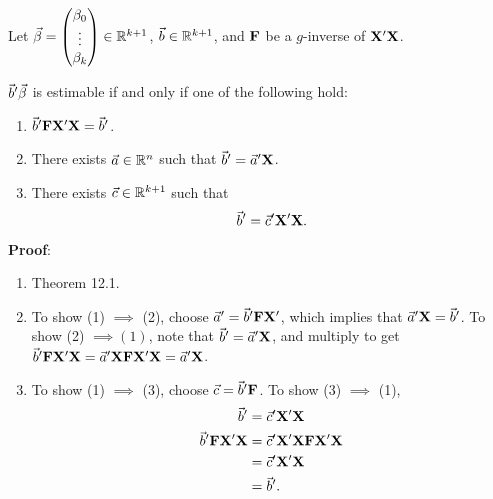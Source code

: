 \begin{Theorem}{}{}
    Let $ \vec{\beta}=\begin{pmatrix}
            \beta_0 \\
            \vdots  \\
            \beta_k
        \end{pmatrix}\in\mathbb{R}^{k+1} $, $ \vec{b}\in\mathbb{R}^{k+1} $, and $ \mathbf{F} $ be a $ g $-inverse
    of $ \mathbf{X}'\mathbf{X} $.

    $ \vec{b}'\vec{\beta} $ is estimable if and only if one of the following hold:
    \begin{enumerate}[(1)]
        \item $ \vec{b}'\mathbf{F}\mathbf{X}'\mathbf{X}=\vec{b}' $.
        \item There exists $ \vec{a}\in\mathbb{R}^{n} $ such that $ \vec{b}'=\vec{a}'\mathbf{X} $.
        \item There exists $ \vec{c}\in\mathbb{R}^{k+1} $ such that
              \[ \vec{b}'=\vec{c}'\mathbf{X}'\mathbf{X}. \]
    \end{enumerate}
    \tcblower{}
    \textbf{Proof}:
    \begin{enumerate}[(1)]
        \item Theorem 12.1.
        \item To show (1) $\implies$ (2), choose $ \vec{a}'=\vec{b}'\mathbf{F}\mathbf{X}' $,
              which implies that $ \vec{a}'\mathbf{X}=\vec{b}' $.
              To show (2) $ \implies (1) $, note that $ \vec{b}'=\vec{a}'\mathbf{X} $,
              and multiply to get $ \vec{b}'\mathbf{F}\mathbf{X}'\mathbf{X}=\vec{a}'\mathbf{X}\mathbf{F}\mathbf{X}'\mathbf{X}=\vec{a}'\mathbf{X} $.
        \item To show (1) $ \implies $ (3), choose $ \vec{c}=\vec{b}'\mathbf{F} $.
              To show (3) $ \implies $ (1),
              \begin{align*}
                  \vec{b}'                                & =\vec{c}'\mathbf{X}'\mathbf{X}                                \\
                  \vec{b}'\mathbf{F}\mathbf{X}'\mathbf{X} & =\vec{c}'\mathbf{X}'\mathbf{X}\mathbf{F}\mathbf{X}'\mathbf{X} \\
                                                             & =\vec{c}'\mathbf{X}'\mathbf{X}                                \\
                                                             & =\vec{b}'.
              \end{align*}
    \end{enumerate}
\end{Theorem}
